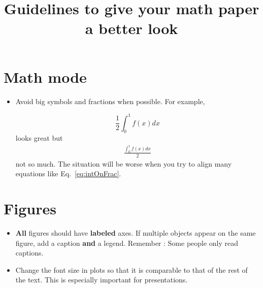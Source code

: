 \documentclass[a4paper,11pt]{article}
\title{Guidelines to give your math paper a better look}
\date{}
\begin{document}
\maketitle
\tableofcontents

\section{Math mode}

\begin{itemize}
\item Avoid big symbols and fractions when possible. For example,

$$
\frac{1}{2}\int_{0}^1 f(x)dx
$$
looks great but
\begin{align}
\frac{\int_{0}^1 f(x)dx}{2}
\label{eq:intOnFrac}
\end{align}
not so much. The situation will be worse when you try to align many equations like Eq.~\eqref{eq:intOnFrac}.

\end{itemize}


\section{Figures}
\begin{itemize}

\item \textbf{All} figures should have \textbf{labeled} axes. If multiple objects appear on the same figure, add a caption \textbf{and} a legend. Remember : Some people only read captions.

\item Change the font size in plots so that it is comparable to that of the rest of the text. This is especially important for presentations. 
\end{itemize}
\end{document}

